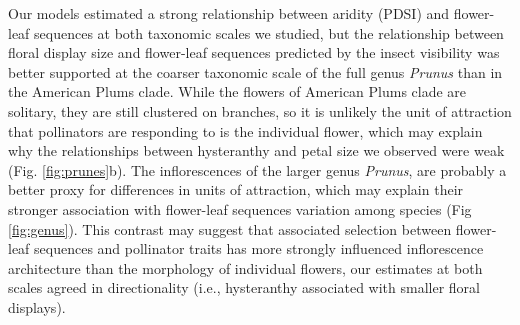\documentclass{article}[12pt]
\begin{document}
{%


Our models estimated a strong relationship between aridity (PDSI) and flower-leaf sequences at both taxonomic scales we studied, but the relationship between floral display size and flower-leaf sequences predicted by the insect visibility was better supported at the coarser taxonomic scale of the full genus \emph{Prunus} than in the American Plums clade. While the flowers of American Plums clade are solitary, they are still clustered on branches, so it is unlikely the unit of attraction that pollinators are responding to is the individual flower, which may explain why the relationships between hysteranthy and petal size we observed were weak (Fig. \ref{fig:prunes}b). The inflorescences of the larger genus \emph{Prunus}, are probably a better proxy for differences in units of attraction, which may explain their stronger association with flower-leaf sequences variation among species (Fig \ref{fig:genus}). This contrast may suggest that associated selection between flower-leaf sequences and pollinator traits has more strongly influenced inflorescence architecture than the morphology of individual flowers, our estimates at both scales agreed in directionality (i.e., hysteranthy associated with smaller floral displays). 

}
\end{document}
